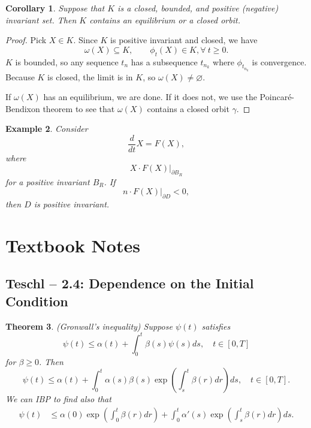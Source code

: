\documentclass{tufte-handout}
\let\O\varnothing
\newtheorem{thm}{Theorem}[subsection]
\newtheorem{cor}[thm]{Corollary}
\newtheorem{ex}[thm]{Example}
\theoremstyle{definition}
\begin{document}
\begin{cor}
	Suppose that $K$ is a closed, bounded, and positive (negative) invariant set. Then $K$ contains an equilibrium or a closed orbit.	
\end{cor}

\begin{proof}
	Pick $X \in K$.
	Since $K$ is positive invariant and closed, we have \[
		\omega(X) \subseteq K, \qquad \phi_t(X) \in K, \forall\ t \ge 0
	.\] 
	$K$ is bounded, so any sequence $t_n$ has a subsequence $t_{n_k}$ where $\phi_{t_{n_k}}$ is convergence. Because $K$ is closed, the limit is in $K$, so $\omega(X) \ne \O$.

	If $\omega(X)$ has an equilibrium, we are done. If it does not, we use the Poincar\'e-Bendixon theorem to see that $\omega(X)$ contains a closed orbit $\gamma$.
\end{proof}
	
\begin{ex}
	Consider \[
		\frac{d}{dt}X = F(X)
	,\] where \[
		X \cdot F(X) \left.\right|_{\partial B_R}
	\] for a positive invariant $B_R$. If \[
		n \cdot F(X) \left.\right|_{\partial D} < 0
	,\] then $D$ is positive invariant. 
\end{ex}



\section{Textbook Notes}

\subsection{Teschl -- 2.4: Dependence on the Initial Condition}
\begin{thm}
	(Gronwall's inequality) Suppose $\psi(t)$ satisfies \[
		\psi(t) \le \alpha(t) + \int_{0}^{t} \beta(s)\psi(s)ds ,\quad t \in [0,T]
	\] for $\beta \ge 0$. Then \[
	\psi(t) \le \alpha(t) + \int_{0}^{t} \alpha (s) \beta(s) \operatorname{exp}\left(\int_{s}^{t} \beta(r)dr \right)ds , \quad t \in[0,T]
	.\] We can IBP to find also that
	\begin{align*}
		\psi(t) &\le \alpha(0) \operatorname{exp}\left(\int_{0}^{t} \beta(r)dr \right) + \int_{0}^{t} \alpha'(s) \operatorname{exp}\left(\int_{s}^{t} \beta(r)dr \right)ds  
	.\end{align*}
\end{thm}
\end{document}
